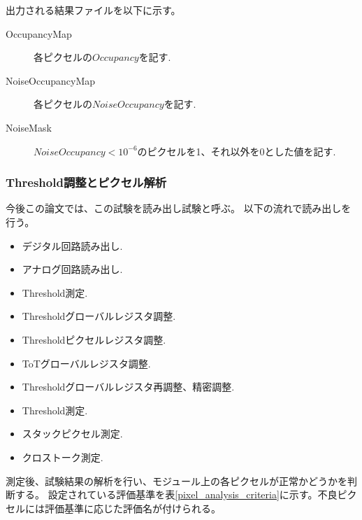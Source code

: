 出力される結果ファイルを以下に示す。
\begin{description}
  \item [OccupancyMap] 各ピクセルの$Occupancy$を記す.
  \item [NoiseOccupancyMap] 各ピクセルの$NoiseOccupancy$を記す.
  \item [NoiseMask] $NoiseOccupancy < 10^{-6}$のピクセルを1、それ以外を0とした値を記す.
\end{description}
  
\subsubsection{Threshold調整とピクセル解析}\label{sec:pixel_analysis}
今後この論文では、この試験を読み出し試験と呼ぶ。
以下の流れで読み出しを行う。
\begin{itemize}
  \item デジタル回路読み出し.
  \item アナログ回路読み出し.
  \item Threshold測定.
  \item Thresholdグローバルレジスタ調整.
  \item Thresholdピクセルレジスタ調整.
  \item ToTグローバルレジスタ調整.
  \item Thresholdグローバルレジスタ再調整、精密調整.
  \item Threshold測定.
  \item スタックピクセル測定.
  \item クロストーク測定.
\end{itemize}

測定後、試験結果の解析を行い、モジュール上の各ピクセルが正常かどうかを判断する。
設定されている評価基準を表\ref{pixel_analysis_criteria}に示す。不良ピクセルには評価基準に応じた評価名が付けられる。

